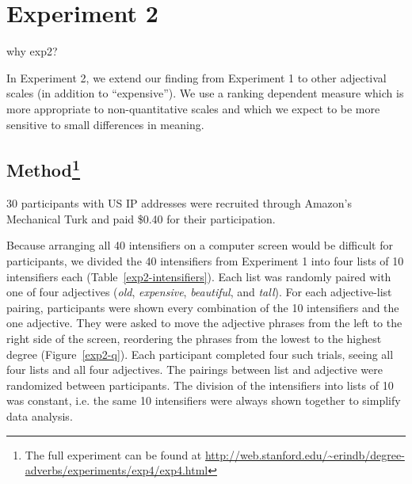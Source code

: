 \documentclass[10pt,letterpaper]{article}
\newcommand{\w}[1]{\emph{#1}}
\newcommand{\todo}[1]{{\color{red}#1}}
\begin{document}

\section{Experiment 2}



\todo{why exp2?}


In Experiment 2, we extend our finding from Experiment 1 to other adjectival scales (in addition to ``expensive''). We use a ranking dependent measure which is more appropriate to non-quantitative scales and which we expect to be more sensitive to small differences in meaning.

\subsection{Method\footnote{The full experiment can be found at \url{http://web.stanford.edu/~erindb/degree-adverbs/experiments/exp4/exp4.html}}}

30 participants with US IP addresses were recruited through Amazon's Mechanical Turk and paid \$0.40 for their participation.

Because arranging all 40 intensifiers on a computer screen would be difficult for participants, we divided the 40 intensifiers from Experiment 1 into four lists of 10 intensifiers each (Table~\ref{exp2-intensifiers}).
Each list was randomly paired with one of four adjectives (\w{old}, \w{expensive}, \w{beautiful}, and \w{tall}).
For each adjective-list pairing, participants were shown every combination of the 10 intensifiers and the one adjective.
They were asked to move the adjective phrases from the left to the right side of the screen, reordering the phrases from the lowest to the highest degree (Figure~\ref{exp2-q}).
Each participant completed four such trials, seeing all four lists and all four adjectives.
The pairings between list and adjective were randomized between participants.
The division of the intensifiers into lists of 10 was constant, i.e. the same 10 intensifiers were always shown together to simplify data analysis.
\end{document}
